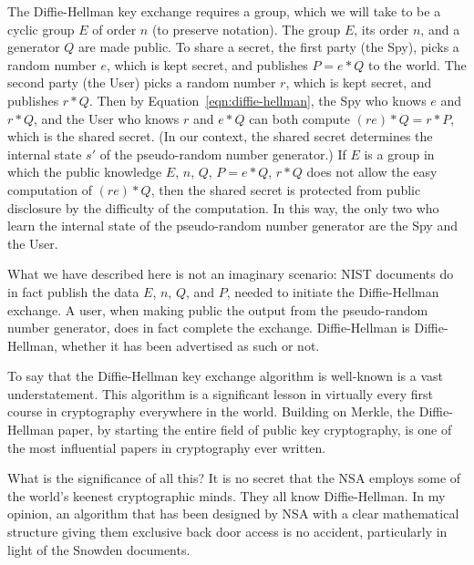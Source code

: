 \documentclass[11pt]{amsart} %
\begin{document}
The Diffie-Hellman key exchange requires a group, which  we will take to
be a cyclic group $E$ of order $n$ (to preserve notation).  
The group $E$, its order $n$, and a generator $Q$
are made public.    To share a secret, 
the first party  (the Spy), picks a random number $e$, which is kept
secret, and publishes $P = e * Q$ to the world.  
The second party (the User) picks a random number
$r$, which is kept secret, and publishes $r * Q$.   Then
by Equation~\ref{eqn:diffie-hellman}, 
the Spy who knows $e$ and $r *Q$, 
and the User who knows $r$ and $e * Q$ can both compute
$(r e) * Q = r * P$, which is the shared secret.
(In our context, the shared secret determines the internal state $s'$ of the pseudo-random number generator.)
If $E$ is a group in which the public knowledge $E$, $n$, $Q$, $P = e * Q$, $r * Q$ does not
allow the easy computation of $(r e) * Q$, then the shared secret is protected from public disclosure 
by the difficulty of the computation.  
In this way, the only two who learn the internal state
of the pseudo-random number generator are the Spy and the User.

What we have described here is not an imaginary scenario: NIST documents do in fact publish the
data $E$, $n$, $Q$, and $P$, needed to initiate the Diffie-Hellman exchange.
A user, when making public the output from the pseudo-random number generator, does in fact complete the
exchange.  Diffie-Hellman is Diffie-Hellman, whether it has been advertised as such or not.

To say that the Diffie-Hellman key exchange algorithm is well-known is a vast understatement.
This algorithm is a significant lesson in  virtually every first course in cryptography
 everywhere
in the world.
Building on Merkle, the Diffie-Hellman paper, by starting the entire field of public key cryptography,
is one of the most influential papers in cryptography ever written.

What is the significance of all this?     It is no secret that the NSA employs some of the world's keenest cryptographic minds.  
They all know Diffie-Hellman. 
In my opinion, an algorithm that
has been designed by NSA with a clear mathematical structure giving them exclusive back door access is
no accident, particularly in light of the Snowden documents.  















\end{document}
